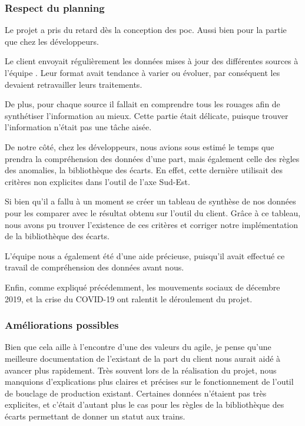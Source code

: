 \subsubsection{Respect du planning}

Le projet a pris du retard dès la conception des \gls{poc}. Aussi bien pour la partie \ds que chez les développeurs.

Le client envoyait régulièrement les données mises à jour des différentes sources \sncf à l'équipe \ds. Leur format avait tendance à varier ou évoluer, par conséquent les \ds devaient retravailler leurs traitements.

De plus, pour chaque source il fallait en comprendre tous les rouages afin de synthétiser l'information au mieux. Cette partie était délicate, puisque trouver l'information n'était pas une tâche aisée.

De notre côté, chez les développeurs, nous avions sous estimé le temps que prendra la compréhension des données d'une part, mais également celle des règles des anomalies, la bibliothèque des écarts. En effet, cette dernière utilisait des critères non explicites dans l'outil de l'axe Sud-Est.

Si bien qu'il a fallu à un moment se créer un tableau de synthèse de nos données pour les comparer avec le résultat obtenu sur l'outil du client. Grâce à ce tableau, nous avons pu trouver l'existence de ces critères et corriger notre implémentation de la bibliothèque des écarts.

L'équipe \ds nous a également été d'une aide précieuse, puisqu'il avait effectué ce travail de compréhension des données avant nous.

Enfin, comme expliqué précédemment, les mouvements sociaux de décembre 2019, et la crise du \textsc{COVID-19} ont ralentit le déroulement du projet.

\subsubsection{Améliorations possibles}

 Bien que cela aille à l'encontre d'une des valeurs du \gls{agile}, je pense qu'une meilleure documentation de l'existant de la part du client nous aurait aidé à avancer plus rapidement. Très souvent lors de la réalisation du projet, nous manquions d'explications plus claires et précises sur le fonctionnement de l'outil de bouclage de production existant. Certaines données n'étaient pas très explicites, et c'était d'autant plus le cas pour les règles de la bibliothèque des écarts permettant de donner un statut aux trains.
 
